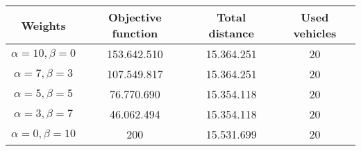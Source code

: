 {
\renewcommand{\arraystretch}{2}
\begin{longtable}[h]{| c | c | c | c |}
    \hline
    \textbf{Weights} & \textbf{Objective function} & \textbf{Total distance} & \textbf{Used vehicles} \\
    \hline
    \endhead
    $\alpha = 10, \beta = 0$ & 153.642.510 & 15.364.251 & 20 \\
    \hline
    $\alpha = 7, \beta = 3$  & 107.549.817 & 15.364.251 & 20 \\
    \hline
    $\alpha = 5, \beta = 5$  &  76.770.690 & 15.354.118 & 20 \\
    \hline
    $\alpha = 3, \beta = 7$  &  46.062.494 & 15.354.118 & 20 \\
    \hline
    $\alpha = 0, \beta = 10$ &         200 & 15.531.699 & 20 \\
    \hline
\end{longtable}
}